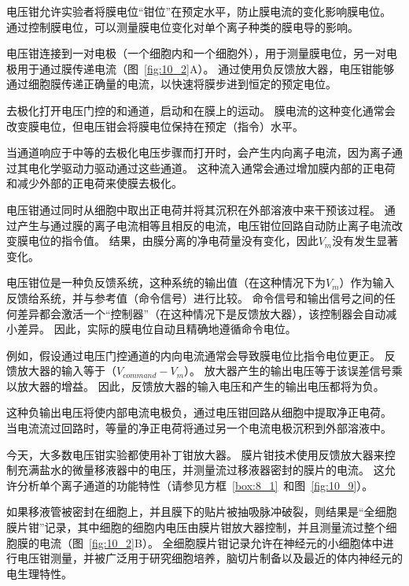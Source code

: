 \begin{proposition}[电压钳技术] \label{box:10_1}
	
	\quad \quad 电压钳允许实验者将膜电位“钳位”在预定水平，防止膜电流的变化影响膜电位。
	通过控制膜电位，可以测量膜电位变化对单个离子种类的膜电导的影响。
	
	\quad \quad 电压钳连接到一对电极（一个细胞内和一个细胞外），用于测量膜电位，另一对电极用于通过膜传递电流（图~\ref{fig:10_2}A）。
	通过使用负反馈放大器，电压钳能够通过细胞膜传递正确量的电流，以快速将膜步进到恒定的预定电位。
	
	\quad \quad 去极化打开电压门控的和通道，启动和在膜上的运动。
	膜电流的这种变化通常会改变膜电位，但电压钳会将膜电位保持在预定（指令）水平。
	
	\quad \quad 当通道响应于中等的去极化电压步骤而打开时，会产生内向离子电流，因为离子通过其电化学驱动力驱动通过这些通道。
	这种流入通常会通过增加膜内部的正电荷和减少外部的正电荷来使膜去极化。
	
	\quad \quad 电压钳通过同时从细胞中取出正电荷并将其沉积在外部溶液中来干预该过程。
	通过产生与通过膜的离子电流相等且相反的电流，电压钳位回路自动防止离子电流改变膜电位的指令值。
	结果，由膜分离的净电荷量没有变化，因此$V_m$没有发生显著变化。
	
	\quad \quad 电压钳位是一种负反馈系统，这种系统的输出值（在这种情况下为$V_m$）作为输入反馈给系统，并与参考值（命令信号）进行比较。
	命令信号和输出信号之间的任何差异都会激活一个“控制器”（在这种情况下是反馈放大器），该控制器会自动减小差异。
	因此，实际的膜电位自动且精确地遵循命令电位。
	
	\quad \quad 例如，假设通过电压门控通道的内向电流通常会导致膜电位比指令电位更正。
	反馈放大器的输入等于（$V_{command}-V_m$）。
	放大器产生的输出电压等于该误差信号乘以放大器的增益。
	因此，反馈放大器的输入电压和产生的输出电压都将为负。
	
	\quad \quad 这种负输出电压将使内部电流电极负，通过电压钳回路从细胞中提取净正电荷。
	当电流流过回路时，等量的净正电荷将通过另一个电流电极沉积到外部溶液中。
	
	\quad \quad 今天，大多数电压钳实验都使用补丁钳放大器。
	膜片钳技术使用反馈放大器来控制充满盐水的微量移液器中的电压，并测量流过移液器密封的膜片的电流。
	这允许分析单个离子通道的功能特性（请参见方框~\ref{box:8_1}~和图~\ref{fig:10_9}）。
	
	\quad \quad 如果移液管被密封在细胞上，并且膜下的贴片被抽吸脉冲破裂，则结果是“全细胞膜片钳”记录，其中细胞的细胞内电压由膜片钳放大器控制，并且测量流过整个细胞膜的电流（图~\ref{fig:10_2}B）。
	全细胞膜片钳记录允许在神经元的小细胞体中进行电压钳测量，并被广泛用于研究细胞培养，脑切片制备以及最近的体内神经元的电生理特性。
	
\end{proposition}



